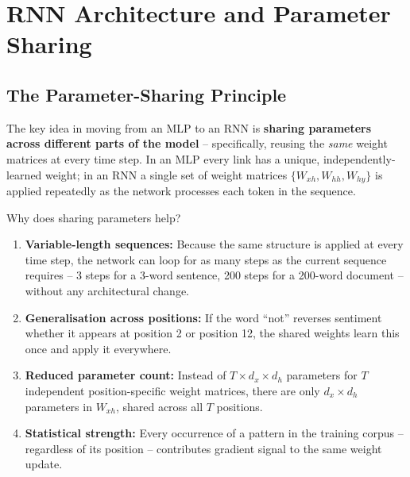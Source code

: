 \documentclass[12pt,a4paper]{article}
\newcommand{\Whh}{W_{hh}}
\newcommand{\Wxh}{W_{xh}}
\newcommand{\Why}{W_{hy}}
\begin{document}
\section{RNN Architecture and Parameter Sharing}
\label{sec:rnn_arch}

\subsection{The Parameter-Sharing Principle}
\label{subsec:param_sharing}

\begin{keyinsight}[title=Core Innovation of RNNs]
The key idea in moving from an MLP to an RNN is \textbf{sharing parameters
across different parts of the model} -- specifically, reusing the \emph{same}
weight matrices at every time step.  In an MLP every link has a unique,
independently-learned weight; in an RNN a single set of weight matrices
$\{\Wxh, \Whh, \Why\}$ is applied repeatedly as the network processes each
token in the sequence.
\end{keyinsight}

Why does sharing parameters help?

\begin{enumerate}[label=\arabic*.]
  \item \textbf{Variable-length sequences:} Because the same structure is
        applied at every time step, the network can loop for as many steps as
        the current sequence requires -- 3 steps for a 3-word sentence, 200
        steps for a 200-word document -- without any architectural change.
  \item \textbf{Generalisation across positions:} If the word ``not'' reverses
        sentiment whether it appears at position 2 or position 12, the shared
        weights learn this once and apply it everywhere.
  \item \textbf{Reduced parameter count:} Instead of $T \times d_x \times d_h$
        parameters for $T$ independent position-specific weight matrices, there
        are only $d_x \times d_h$ parameters in $\Wxh$, shared across all $T$
        positions.
  \item \textbf{Statistical strength:} Every occurrence of a pattern in the
        training corpus -- regardless of its position -- contributes gradient
        signal to the same weight update.
\end{enumerate}
\end{document}
